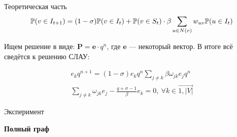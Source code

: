 	\begin{frame}{Теоретическая часть}
		\begin{equation*}
			\mathbb{P}(v \in I_{t+1}) = (1 - \sigma) \mathbb{P}(v \in I_t) + \mathbb{P}(v \in S_t) \cdot \beta \sum\limits_{u \in N(v)} w_{uv} \mathbb{P}(u \in I_t)
		\end{equation*}
	
	Ищем решение в виде: $ \mathbf{P} = \mathbf{e} \cdot q^n$, где $\mathbf{e}$ --- некоторый вектор. В итоге всё сведётся к решению СЛАУ:
	
	\begin{gather*}
		e_k q^{n+1} = (1 - \sigma) e_k q^n \sum\limits_{j \not= k} \beta \omega_{jk} e_j q^n \\
		\sum\limits_{j \not= k} \omega_{jk} e_j - \frac{q + \sigma - 1}{\beta} e_k = 0, \  \forall k \in \overrightarrow{1, |V|}
	\end{gather*}
		
	\end{frame}

	\begin{frame}{Эксперимент}
		\renewcommand{\thesubfigure}{}
		
		\begin{figure}
		\end{figure}

	\begin{center}
		\textbf{{\large Полный граф}}
	\end{center}
		
	\end{frame}


